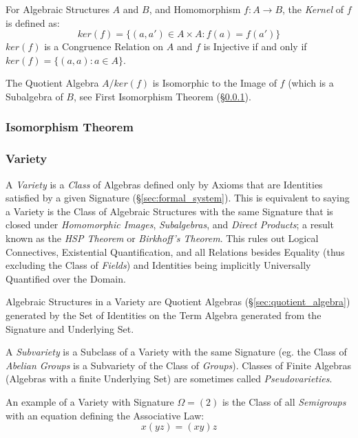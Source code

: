 For Algebraic Structures $A$ and $B$, and Homomorphism $f: A
\rightarrow B$, the \emph{Kernel} of $f$ is defined as:
\[
    ker(f) = \{ (a,a') \in A \times A : f(a) = f(a') \}
\]
$ker(f)$ is a Congruence Relation on $A$ and $f$ is Injective if and
only if $ker(f) = \{(a,a) : a \in A\}$.

The Quotient Algebra $A/ker(f)$ is Isomorphic to the Image of $f$
(which is a Subalgebra of $B$, see First Isomorphism Theorem
(\S\ref{sec:isomorphism_theorem}).



\subsubsection{Isomorphism Theorem}\label{sec:isomorphism_theorem}



\subsubsection{Variety}\label{sec:model_variety}

A \emph{Variety} is a \emph{Class} of Algebras defined only by Axioms
that are Identities satisfied by a given Signature
(\S\ref{sec:formal_system}). This is equivalent to saying a Variety
is the Class of Algebraic Structures with the same Signature that is
closed under \emph{Homomorphic Images}, \emph{Subalgebras}, and
\emph{Direct Products}; a result known as the \emph{HSP Theorem} or
\emph{Birkhoff's Theorem}\cite{birkhoff35}. This rules out Logical
Connectives, Existential Quantification, and all Relations besides
Equality (thus excluding the Class of \emph{Fields}) and Identities
being implicitly Universally Quantified over the Domain.

Algebraic Structures in a Variety are Quotient Algebras
(\S\ref{sec:quotient_algebra}) generated by the Set of Identities
on the Term Algebra generated from the Signature and Underlying Set.

A \emph{Subvariety} is a Subclass of a Variety with the same Signature
(eg. the Class of \emph{Abelian Groups} is a Subvariety of the Class
of \emph{Groups}). Classes of Finite Algebras (Algebras with a finite
Underlying Set) are sometimes called \emph{Pseudovarieties}.

An example of a Variety with Signature $\Omega = (2)$ is the Class of
all \emph{Semigroups} with an equation defining the Associative Law:
\[
    x(yz) = (xy)z
\]


